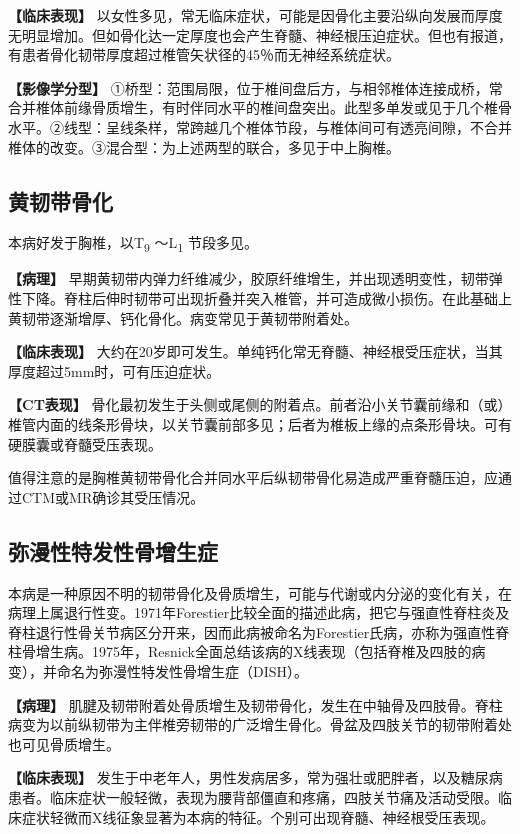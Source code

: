 \textbf{【临床表现】}
以女性多见，常无临床症状，可能是因骨化主要沿纵向发展而厚度无明显增加。但如骨化达一定厚度也会产生脊髓、神经根压迫症状。但也有报道，有患者骨化韧带厚度超过椎管矢状径的45％而无神经系统症状。

\textbf{【影像学分型】}
①桥型：范围局限，位于椎间盘后方，与相邻椎体连接成桥，常合并椎体前缘骨质增生，有时伴同水平的椎间盘突出。此型多单发或见于几个椎骨水平。②线型：呈线条样，常跨越几个椎体节段，与椎体间可有透亮间隙，不合并椎体的改变。③混合型：为上述两型的联合，多见于中上胸椎。

\subsection{黄韧带骨化}

本病好发于胸椎，以T\textsubscript{9} ～L\textsubscript{1} 节段多见。

\textbf{【病理】}
早期黄韧带内弹力纤维减少，胶原纤维增生，并出现透明变性，韧带弹性下降。脊柱后伸时韧带可出现折叠并突入椎管，并可造成微小损伤。在此基础上黄韧带逐渐增厚、钙化骨化。病变常见于黄韧带附着处。

\textbf{【临床表现】}
大约在20岁即可发生。单纯钙化常无脊髓、神经根受压症状，当其厚度超过5mm时，可有压迫症状。

\textbf{【CT表现】}
骨化最初发生于头侧或尾侧的附着点。前者沿小关节囊前缘和（或）椎管内面的线条形骨块，以关节囊前部多见；后者为椎板上缘的点条形骨块。可有硬膜囊或脊髓受压表现。

值得注意的是胸椎黄韧带骨化合并同水平后纵韧带骨化易造成严重脊髓压迫，应通过CTM或MR确诊其受压情况。

\subsection{弥漫性特发性骨增生症}

本病是一种原因不明的韧带骨化及骨质增生，可能与代谢或内分泌的变化有关，在病理上属退行性变。1971年Forestier比较全面的描述此病，把它与强直性脊柱炎及脊柱退行性骨关节病区分开来，因而此病被命名为Forestier氏病，亦称为强直性脊柱骨增生病。1975年，Resnick全面总结该病的X线表现（包括脊椎及四肢的病变），并命名为弥漫性特发性骨增生症（DISH）。

\textbf{【病理】}
肌腱及韧带附着处骨质增生及韧带骨化，发生在中轴骨及四肢骨。脊柱病变为以前纵韧带为主伴椎旁韧带的广泛增生骨化。骨盆及四肢关节的韧带附着处也可见骨质增生。

\textbf{【临床表现】}
发生于中老年人，男性发病居多，常为强壮或肥胖者，以及糖尿病患者。临床症状一般轻微，表现为腰背部僵直和疼痛，四肢关节痛及活动受限。临床症状轻微而X线征象显著为本病的特征。个别可出现脊髓、神经根受压表现。

